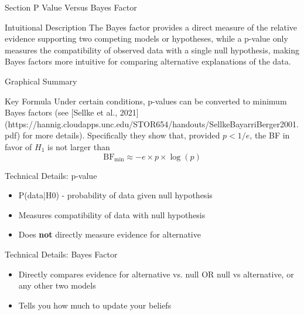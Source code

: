 
\begin{frame}{Section}
\centering
\Huge{P Value Versus Bayes Factor}
\end{frame}


\begin{frame}{Intuitional Description}
The Bayes factor provides a direct measure of the relative evidence supporting two competing models or hypotheses, while a p-value only measures the compatibility of observed data with a single null hypothesis, making Bayes factors more intuitive for comparing alternative explanations of the data.
\end{frame}

\begin{frame}{Graphical Summary}

\end{frame}


\begin{frame}{Key Formula}
Under certain conditions, p-values can be converted to minimum Bayes factors (see [Sellke et al., 2021](https://hannig.cloudapps.unc.edu/STOR654/handouts/SellkeBayarriBerger2001.pdf) for more details).
Specifically they show that, provided $p<1/e$, the BF in favor of $H_1$ is not larger than
$$
\text{BF}_\text{min} \approx −e\times p \times \log(p)
$$
\end{frame}


\begin{frame}{Technical Details: p-value}
\begin{itemize}
\item P(data|H0) - probability of data given null hypothesis
\item Measures compatibility of data with null hypothesis
\item Does \textbf{not} directly measure evidence for alternative
\end{itemize}

\end{frame}

\begin{frame}{Technical Details: Bayes Factor}
\begin{itemize}
\item Directly compares evidence for alternative vs. null OR null vs alternative, or any other two models
\item Tells you how much to update your beliefs
\end{itemize}
\end{frame}


